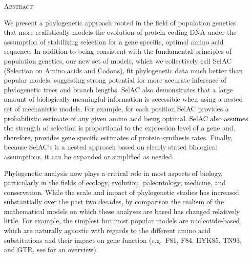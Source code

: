 \documentclass[12pt,letterpaper]{article}
\renewcommand{\section}[1]{%
\bigskip
\begin{center}
\begin{Large}
\normalfont\scshape #1
\medskip
\end{Large}
\end{center}}
\begin{document}


\newpage

\section{Abstract}
We present a phylogenetic approach rooted in the field of population genetics that more realistically models the evolution of protein-coding DNA under the assumption of stabilizing selection for a gene specific, optimal amino acid sequence.
In addition to being consistent with the fundamental principles of population genetics, our new set of models, which we collectively call SelAC (Selection on Amino acids and Codons), fit phylogenetic data much better than popular models, suggesting strong potential for more accurate inference of phylogenetic trees and branch lengths.
SelAC also demonstrates that a large amount of biologically meaningful information is accessible when using a nested set of mechanistic models.
For example, for each position SelAC provides a probabilistic estimate of any given amino acid being optimal.
SelAC also assumes the strength of selection is proportional to the expression level of a gene and, therefore, provides gene specific estimates of protein synthesis rates.
Finally, because SelAC's is a nested approach based on clearly stated biological assumptions, it can be expanded or simplified as needed.

\newpage




Phylogenetic analysis now plays a critical role in most aspects of biology, particularly in the fields of ecology, evolution, paleontology, medicine, and conservation.
While the scale and impact of phylogenetic studies has increased substantially over the past two decades, by comparison the realism of the mathematical models on which these analyses are based has changed relatively little.
For example, the simplest but most popular models are nucleotide-based, which are naturally agnostic with regards to the different amino acid substitutions and their impact on gene function (e.g.~F81, F84, HYK85, TN93, and GTR, see \citet{Yang2014} for an overview).
\end{document}
